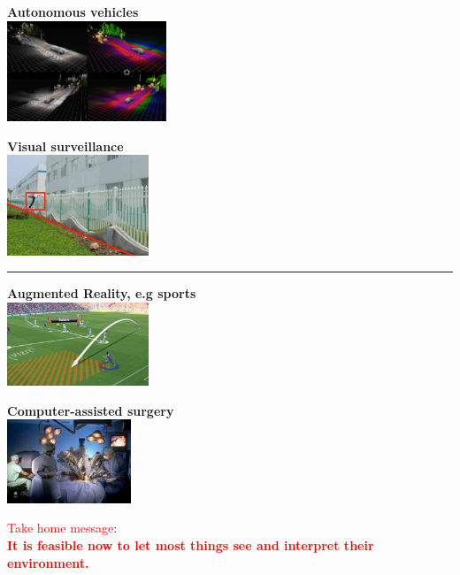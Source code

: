 \documentclass[a4paper, fontsize=8pt, landscape, DIV=1]{scrartcl}
\begin{document}
\begin{multicols*}{4}
\begin{minipage}[t]{0.49\columnwidth}
			\begin{flushleft}
				{\centering \textbf{Autonomous vehicles}\\}
				\includegraphics[width=\columnwidth, height=3cm]{images/Introduction/app_autonomous_vehicles.png} 
			\end{flushleft}
		\end{minipage}
		\begin{minipage}[t]{0.49\columnwidth}
			\begin{flushright}
				{\centering \textbf{Visual surveillance}\\}
				\includegraphics[width=\columnwidth, height=3cm]{images/Introduction/app_surveillance.png}
			\end{flushright}
		\end{minipage}
		\hrule
		\begin{minipage}[t]{0.49\columnwidth}
			\begin{flushleft}
				{\centering \textbf{Augmented Reality, e.g sports}\\}
				\includegraphics[width=\columnwidth, height=2.5cm]{images/Introduction/app_augm_reality.png} 
			\end{flushleft}
		\end{minipage}
		\begin{minipage}[t]{0.49\columnwidth}
			\begin{flushright}
				{\centering \textbf{Computer-assisted surgery}\\}
				\includegraphics[width=\columnwidth, height=2.5cm]{images/Introduction/app_surgery.png}
			\end{flushright}
		\end{minipage}			
		\par 
		\textcolor{red}{Take home message}:\\
		\textbf{\textcolor{red}{It is feasible now to let most things see and interpret their environment.}}
		

\end{multicols*}
\end{document}
